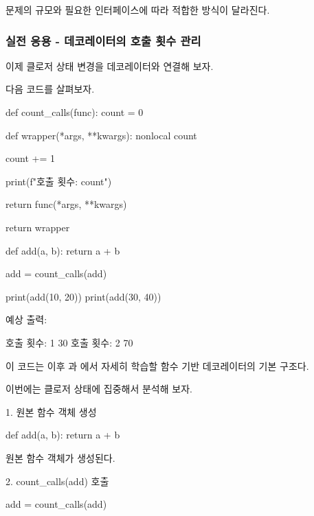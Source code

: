 문제의 규모와 필요한 인터페이스에 따라 적합한 방식이 달라진다.

\subsubsection{실전 응용 - 데코레이터의 호출 횟수 관리}

이제 클로저 상태 변경을 데코레이터와 연결해 보자.

다음 코드를 살펴보자.

\begin{dhkcode}
def count_calls(func):
    count = 0

    def wrapper(*args, **kwargs):
        nonlocal count

        count += 1

        print(f"호출 횟수: {count}")

        return func(*args, **kwargs)

    return wrapper


def add(a, b):
    return a + b


add = count_calls(add)

print(add(10, 20))
print(add(30, 40))
\end{dhkcode}

예상 출력:

\begin{dhkzsh}
호출 횟수: 1
30
호출 횟수: 2
70
\end{dhkzsh}

이 코드는 이후 과 에서 자세히 학습할 함수 기반 데코레이터의 기본 구조다.

이번에는 클로저 상태에 집중해서 분석해 보자.

\begin{dhknote}
\begin{dhksmry}[centered]
1. 원본 함수 객체 생성
\end{dhksmry}
\end{dhknote}

\begin{dhkcode}
def add(a, b):
    return a + b
\end{dhkcode}

원본  함수 객체가 생성된다.

\begin{dhknote}
\begin{dhksmry}[centered]
2. count_calls(add) 호출
\end{dhksmry}
\end{dhknote}

\begin{dhkcode}
add = count_calls(add)
\end{dhkcode}

